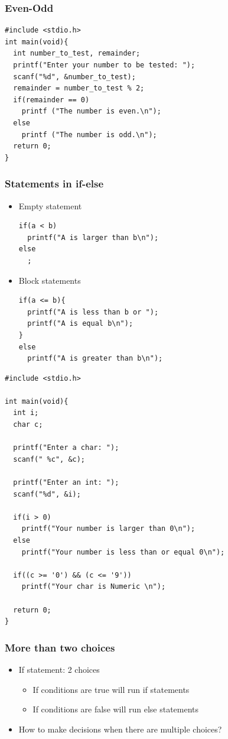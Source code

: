 \documentclass{../c-lecture}
\begin{document}
\begin{frame}[fragile]
  \frametitle{Even-Odd}
  \begin{verbatim}
#include <stdio.h>
int main(void){
  int number_to_test, remainder;
  printf("Enter your number to be tested: ");
  scanf("%d", &number_to_test);
  remainder = number_to_test % 2;
  if(remainder == 0)
    printf ("The number is even.\n");
  else
    printf ("The number is odd.\n");
  return 0;
}
  \end{verbatim}
\end{frame}

\begin{frame}[fragile]
  \frametitle{Statements in if-else}
  \begin{itemize}
    \item Empty statement
    \begin{verbatim}
if(a < b)
  printf("A is larger than b\n");
else
  ;
    \end{verbatim}
    \item Block statements
    \begin{verbatim}
if(a <= b){
  printf("A is less than b or ");
  printf("A is equal b\n");
}
else
  printf("A is greater than b\n");
    \end{verbatim}
  \end{itemize}
\end{frame}

\begin{frame}[fragile]
  \begin{verbatim}
#include <stdio.h>

int main(void){
  int i;
  char c;

  printf("Enter a char: ");
  scanf(" %c", &c);

  printf("Enter an int: ");
  scanf("%d", &i);

  if(i > 0)
    printf("Your number is larger than 0\n");
  else
    printf("Your number is less than or equal 0\n");

  if((c >= '0') && (c <= '9'))
    printf("Your char is Numeric \n");

  return 0;
}
  \end{verbatim}
\end{frame}

\begin{frame}
  \frametitle{More than two choices}
  \begin{itemize}
    \item If statement: 2 choices
    \begin{itemize}
      \item If conditions are true will run if statements
      \item If conditions are false will run else statements
    \end{itemize}
    \item How to make decisions when there are multiple choices?
  \end{itemize}
\end{frame}
\end{document}
